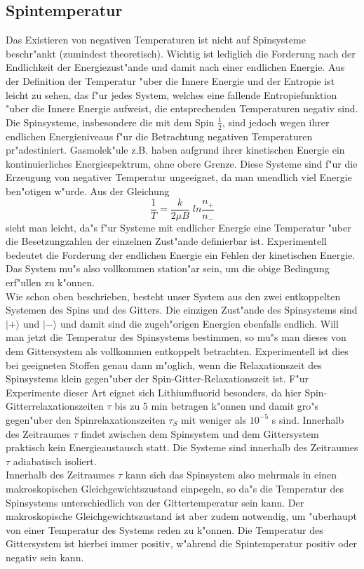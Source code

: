 \documentclass[12pt]{article}
\begin{document}
\begin{module}[id=mytemparature,uses=probability-intro]
\section{Spintemperatur}
Das Existieren von negativen Temperaturen ist nicht auf 
Spinsysteme beschr"ankt (zumindest theoretisch).
Wichtig ist lediglich die Forderung nach der Endlichkeit der
Energiezust"ande und damit nach einer endlichen Energie. Aus der Definition 
der Temperatur "uber die Innere Energie
und der Entropie ist leicht zu sehen, das f"ur jedes System, welches eine 
fallende Entropiefunktion "uber die Innere Energie aufweist, 
die entsprechenden Temperaturen negativ sind.\\
Die Spinsysteme, insbesondere die mit dem Spin $\frac{1}{2}$, sind jedoch
wegen ihrer endlichen Energieniveaus f"ur die Betrachtung negativen 
Temperaturen pr"adestiniert. Gasmolek"ule z.B. haben aufgrund ihrer kinetischen 
Energie ein kontinuierliches Energiespektrum, ohne obere Grenze. Diese Systeme 
sind f"ur die Erzeugung von negativer Temperatur ungeeignet, da man unendlich 
viel Energie ben"otigen w"urde.
Aus der Gleichung
\begin{equation}
\label{spintemp}
\frac{1}{T}= \frac{k}{2\mu B}\; ln \frac{n_{+}}{n_{-}}
\end{equation}
sieht man leicht, da"s f"ur Systeme mit endlicher Energie eine Temperatur 
"uber  die Besetzungzahlen der einzelnen Zust"ande definierbar ist.
Experimentell bedeutet die Forderung der endlichen Energie ein Fehlen der 
kinetischen Energie. 
Das System mu"s also vollkommen station"ar sein, um die obige Bedingung 
erf"ullen zu k"onnen. \\
Wie schon oben beschrieben, besteht unser System aus den zwei entkoppelten 
Systemen des Spins und des Gitters. Die einzigen Zust"ande des Spinsystems
sind $|+\rangle$ und $|-\rangle$ und damit sind die zugeh"origen Energien ebenfalls
endlich. Will man jetzt die Temperatur des Spinsystems bestimmen, so mu"s
man dieses von dem Gittersystem als vollkommen entkoppelt betrachten. 
Experimentell ist dies bei geeigneten Stoffen genau dann m"oglich, wenn die
Relaxationszeit des Spinsystems klein gegen"uber der Spin-Gitter-Relaxationszeit 
ist. F"ur Experimente dieser Art eignet sich Lithiumfluorid besonders, da 
hier Spin-Gitterrelaxationszeiten $\tau$ bis zu 5 min betragen k"onnen
und damit gro"s gegen"uber den Spinrelaxationszeiten $\tau_{S}$ mit weniger
als $10^{-5}$ s sind. Innerhalb des Zeitraumes $\tau$ findet zwischen dem 
Spinsystem und dem Gittersystem praktisch kein Energieaustausch statt. 
Die Systeme sind innerhalb des Zeitraumes $\tau$ adiabatisch isoliert.\\
Innerhalb des Zeitraumes $\tau$ kann sich das Spinsystem also mehrmals in
einen makroskopischen Gleichgewichtszustand einpegeln, so da"s die Temperatur
des Spinsystems unterschiedlich von der Gittertemperatur sein kann. Der
makroskopische Gleichgewichtszustand ist aber zudem notwendig, um "uberhaupt 
von einer Temperatur des Systems reden zu k"onnen. Die Temperatur des 
Gittersystem ist hierbei immer positiv, w"ahrend die Spintemperatur positiv 
oder negativ sein kann.



\end{module}
\end{document}
